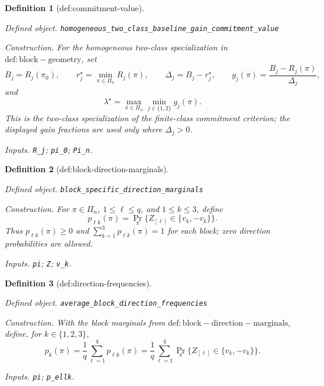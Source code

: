 \documentclass{article}
\newtheorem{definition}{Definition}
\begin{document}
\begin{definition}[def:commitment-value]\label{def:commitment-value}
\par\smallskip\noindent\emph{Defined object.} \texttt{homogeneous\_\allowbreak{}two\_\allowbreak{}class\_\allowbreak{}baseline\_\allowbreak{}gain\_\allowbreak{}commitment\_\allowbreak{}value}
\par\smallskip\noindent\emph{Construction.} For the homogeneous two-class specialization in \(\mathrm{def:block-geometry}\), set
\[
B_j=R_j(\pi_0),
\qquad
r_j^\star=\min_{\pi\in\Pi_n}R_j(\pi),
\qquad
\Delta_j=B_j-r_j^\star,
\qquad
g_j(\pi)=\frac{B_j-R_j(\pi)}{\Delta_j},
\]
and
\[
\lambda^\star=\max_{\pi\in\Pi_n}\min_{j\in\{1,2\}}g_j(\pi).
\]
This is the two-class specialization of the finite-class commitment criterion; the displayed gain fractions are used only where \(\Delta_j>0\).
\par\smallskip\noindent\emph{Inputs.} \texttt{R\_\allowbreak{}j}; \texttt{pi\_\allowbreak{}0}; \texttt{Pi\_\allowbreak{}n}.
\end{definition}

\begin{definition}[def:block-direction-marginals]\label{def:block-direction-marginals}
\par\smallskip\noindent\emph{Defined object.} \texttt{block\_\allowbreak{}specific\_\allowbreak{}direction\_\allowbreak{}marginals}
\par\smallskip\noindent\emph{Construction.} For \(\pi\in\Pi_n\), \(1\le\ell\le q\), and \(1\le k\le3\), define
\[
p_{\ell k}(\pi)
=\Pr_\pi\{Z_{[\ell]}\in\{v_k,-v_k\}\}.
\]
Thus \(p_{\ell k}(\pi)\ge0\) and \(\sum_{k=1}^3p_{\ell k}(\pi)=1\) for each block; zero direction probabilities are allowed.
\par\smallskip\noindent\emph{Inputs.} \texttt{pi}; \texttt{Z}; \texttt{v\_\allowbreak{}k}.
\end{definition}

\begin{definition}[def:direction-frequencies]\label{def:direction-frequencies}
\par\smallskip\noindent\emph{Defined object.} \texttt{average\_\allowbreak{}block\_\allowbreak{}direction\_\allowbreak{}frequencies}
\par\smallskip\noindent\emph{Construction.} With the block marginals from \(\mathrm{def:block-direction-marginals}\), define, for \(k\in\{1,2,3\}\),
\[
p_k(\pi)=\frac1q\sum_{\ell=1}^qp_{\ell k}(\pi)
=\frac1q\sum_{\ell=1}^q
\Pr_\pi\{Z_{[\ell]}\in\{v_k,-v_k\}\}.
\]
\par\smallskip\noindent\emph{Inputs.} \texttt{pi}; \texttt{p\_\allowbreak{}ellk}.
\end{definition}
\end{document}
